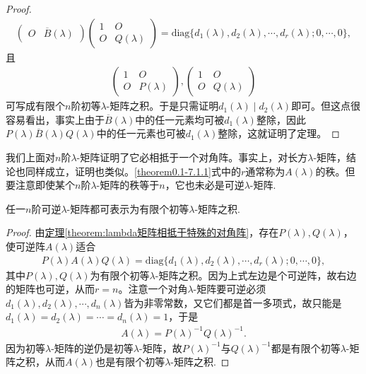 \documentclass[../../main.tex]{subfiles}
\begin{document}
\begin{proof}
\begin{align*}
\begin{pmatrix}
O&\overline{B}(\lambda)
\end{pmatrix}
\begin{pmatrix}
1&O\\
O&Q(\lambda)
\end{pmatrix}
=\mathrm{diag}\{d_1(\lambda),d_2(\lambda),\cdots,d_r(\lambda);0,\cdots,0\},
\end{align*}
且
\begin{align*}
\begin{pmatrix}
1&O\\
O&P(\lambda)
\end{pmatrix},
\begin{pmatrix}
1&O\\
O&Q(\lambda)
\end{pmatrix}
\end{align*}
可写成有限个$n$阶初等$\lambda$-矩阵之积。于是只需证明$d_1(\lambda)\mid d_2(\lambda)$即可。但这点很容易看出，事实上由于$\overline{B}(\lambda)$中的任一元素均可被$d_1(\lambda)$整除，因此$P(\lambda)\overline{B}(\lambda)Q(\lambda)$中的任一元素也可被$d_1(\lambda)$整除，这就证明了定理。
\end{proof}
\begin{remark}
我们上面对$n$阶$\lambda$-矩阵证明了它必相抵于一个对角阵。事实上，对长方$\lambda$-矩阵，结论也同样成立，证明也类似。\eqref{theorem0.1-7.1.1}式中的$r$通常称为$A(\lambda)$的秩。但要注意即使某个$n$阶$\lambda$-矩阵的秩等于$n$，它也未必是可逆$\lambda$-矩阵.
\end{remark}

\begin{corollary}
任一$n$阶可逆$\lambda$-矩阵都可表示为有限个初等$\lambda$-矩阵之积.
\end{corollary}
\begin{proof}
由\hyperref[theorem:lambda矩阵相抵于特殊的对角阵]{定理\ref{theorem:lambda矩阵相抵于特殊的对角阵}}，存在$P(\lambda),Q(\lambda)$，使可逆阵$A(\lambda)$适合
\begin{align*}
P(\lambda)A(\lambda)Q(\lambda)=\mathrm{diag}\{d_1(\lambda),d_2(\lambda),\cdots,d_r(\lambda);0,\cdots,0\},
\end{align*}
其中$P(\lambda),Q(\lambda)$为有限个初等$\lambda$-矩阵之积。因为上式左边是个可逆阵，故右边的矩阵也可逆，从而$r = n$。注意一个对角$\lambda$-矩阵要可逆必须$d_1(\lambda),d_2(\lambda),\cdots,d_n(\lambda)$皆为非零常数，又它们都是首一多项式，故只能是$d_1(\lambda)=d_2(\lambda)=\cdots=d_n(\lambda)=1$，于是
\begin{align*}
A(\lambda)=P(\lambda)^{-1}Q(\lambda)^{-1}.
\end{align*}
因为初等$\lambda$-矩阵的逆仍是初等$\lambda$-矩阵，故$P(\lambda)^{-1}$与$Q(\lambda)^{-1}$都是有限个初等$\lambda$-矩阵之积，从而$A(\lambda)$也是有限个初等$\lambda$-矩阵之积. 
\end{proof}
\end{document}
